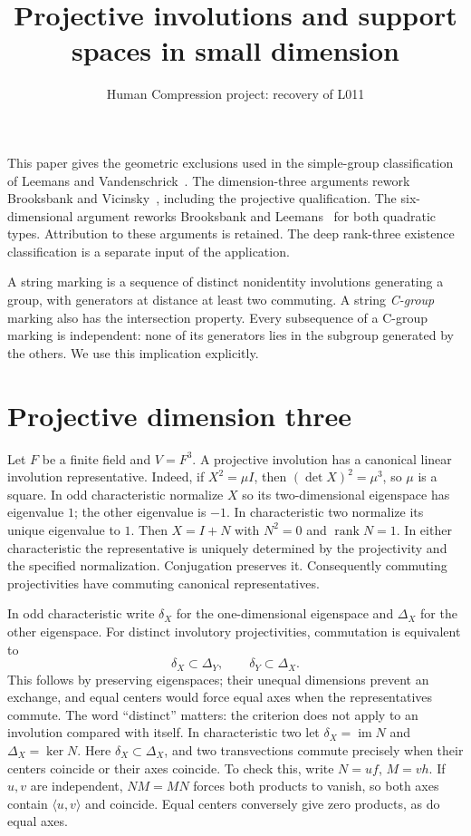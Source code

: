 \documentclass[11pt,a4paper]{article}
\title{Projective involutions and support spaces in small dimension}
\author{Human Compression project: recovery of L011}\date{}
\newcommand{\gen}[1]{\langle #1\rangle}\newcommand{\im}{\operatorname{im}}\newcommand{\GL}{\operatorname{GL}}\newcommand{\PGL}{\operatorname{PGL}}
\begin{document}
\maketitle
This paper gives the geometric exclusions used in the simple-group classification
of Leemans and Vandenschrick~\cite{LV}. The dimension-three arguments rework
Brooksbank and Vicinsky~\cite{BV}, including the projective qualification. The
six-dimensional argument reworks Brooksbank and Leemans~\cite{BL} for both
quadratic types. Attribution to these arguments is retained. The deep
rank-three existence classification is a separate input of the application.

A string marking is a sequence of distinct nonidentity involutions generating
a group, with generators at distance at least two commuting. A string
\emph{C-group} marking also has the intersection property. Every subsequence
of a C-group marking is independent: none of its generators lies in the
subgroup generated by the others. We use this implication explicitly.

\section{Projective dimension three}
Let $F$ be a finite field and $V=F^3$. A projective involution has a canonical
linear involution representative. Indeed, if $X^2=\mu I$, then
$(\det X)^2=\mu^3$, so $\mu$ is a square. In odd characteristic normalize
$X$ so its two-dimensional eigenspace has eigenvalue $1$; the other eigenvalue
is $-1$. In characteristic two normalize its unique eigenvalue to $1$.
Then $X=I+N$ with $N^2=0$ and $\operatorname{rank}N=1$.
In either characteristic the representative is uniquely determined by the
projectivity and the specified normalization. Conjugation preserves it.
Consequently commuting projectivities have commuting canonical representatives.

In odd characteristic write $\delta_X$ for the one-dimensional eigenspace
and $\Delta_X$ for the other eigenspace. For distinct involutory projectivities,
commutation is equivalent to
\[
 \delta_X\subset\Delta_Y,\qquad \delta_Y\subset\Delta_X.
\tag{1}
\]
This follows by preserving eigenspaces; their unequal dimensions prevent an
exchange, and equal centers would force equal axes when the representatives
commute. The word ``distinct'' matters: the criterion does not apply to an
involution compared with itself.
In characteristic two let $\delta_X=\im N$ and $\Delta_X=\ker N$.
Here $\delta_X\subset\Delta_X$, and two transvections commute precisely when
their centers coincide or their axes coincide. To check this, write
$N=u f$, $M=v h$. If $u,v$ are independent, $NM=MN$ forces both products
to vanish, so both axes contain $\gen{u,v}$ and coincide. Equal centers
conversely give zero products, as do equal axes.
\end{document}
